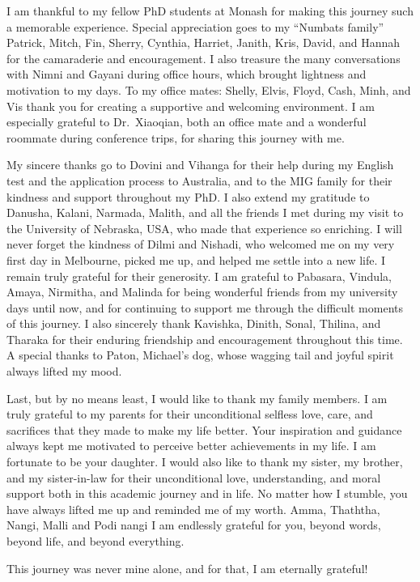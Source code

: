 \documentclass[
  11pt,
  a4paper,
]{report}
\begin{document}
I am thankful to my fellow PhD students at Monash for making this
journey such a memorable experience. Special appreciation goes to my
``Numbats family'' Patrick, Mitch, Fin, Sherry, Cynthia, Harriet,
Janith, Kris, David, and Hannah for the camaraderie and encouragement. I
also treasure the many conversations with Nimni and Gayani during office
hours, which brought lightness and motivation to my days. To my office
mates: Shelly, Elvis, Floyd, Cash, Minh, and Vis thank you for creating
a supportive and welcoming environment. I am especially grateful to
Dr.~Xiaoqian, both an office mate and a wonderful roommate during
conference trips, for sharing this journey with me.

My sincere thanks go to Dovini and Vihanga for their help during my
English test and the application process to Australia, and to the MIG
family for their kindness and support throughout my PhD. I also extend
my gratitude to Danusha, Kalani, Narmada, Malith, and all the friends I
met during my visit to the University of Nebraska, USA, who made that
experience so enriching. I will never forget the kindness of Dilmi and
Nishadi, who welcomed me on my very first day in Melbourne, picked me
up, and helped me settle into a new life. I remain truly grateful for
their generosity. I am grateful to Pabasara, Vindula, Amaya, Nirmitha,
and Malinda for being wonderful friends from my university days until
now, and for continuing to support me through the difficult moments of
this journey. I also sincerely thank Kavishka, Dinith, Sonal, Thilina,
and Tharaka for their enduring friendship and encouragement throughout
this time. A special thanks to Paton, Michael's dog, whose wagging tail
and joyful spirit always lifted my mood.

Last, but by no means least, I would like to thank my family members. I
am truly grateful to my parents for their unconditional selfless love,
care, and sacrifices that they made to make my life better. Your
inspiration and guidance always kept me motivated to perceive better
achievements in my life. I am fortunate to be your daughter. I would
also like to thank my sister, my brother, and my sister-in-law for their
unconditional love, understanding, and moral support both in this
academic journey and in life. No matter how I stumble, you have always
lifted me up and reminded me of my worth. Amma, Thaththa, Nangi, Malli
and Podi nangi I am endlessly grateful for you, beyond words, beyond
life, and beyond everything.

This journey was never mine alone, and for that, I am eternally
grateful!
\end{document}
